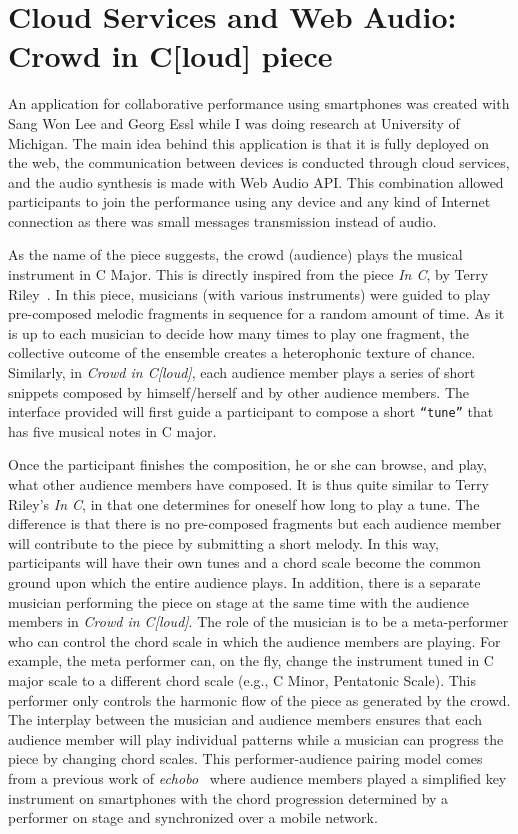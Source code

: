 \section{Cloud Services and Web Audio: Crowd in C[loud] piece}
\label{apesec:appcrowdincloud}

An application for collaborative performance using smartphones was created with Sang Won Lee and Georg Essl while I was doing research at University of Michigan.
The main idea behind this application is that it is fully deployed on the web, the communication between devices is conducted through cloud services, and the audio synthesis is made with Web Audio API.
This combination allowed participants to join the performance using any device and any kind of Internet connection as there was small messages transmission instead of audio.

As the name of the piece suggests, the crowd (audience) plays the musical instrument in C Major. 
This is directly inspired from the piece \textit{In C}, by Terry Riley~\citep{Riley1964inc}. 
In this piece, musicians (with various instruments) were guided to play pre-composed melodic fragments in sequence for a random amount of time. 
As it is up to each musician to decide how many times to play one fragment, the collective outcome of the ensemble creates a heterophonic texture of chance.
Similarly, in \textit{Crowd in C[loud]}, each audience member plays a series of short snippets composed by himself/herself and by other audience members.
The interface provided will first guide a participant to compose a short \texttt{``tune''} that has five musical notes in C major.

Once the participant finishes the composition, he or she can browse, and play, what other audience members have composed. 
It is thus quite similar to Terry Riley's \textit{In C}, in that one determines for oneself how long to play a tune. 
The difference is that there is no pre-composed fragments but each audience member will contribute to the piece by submitting a short melody.
In this way, participants will have their own tunes and a chord scale become the common ground upon which the entire audience plays. 
In addition, there is a separate musician performing the piece on stage at the same time with the audience members in \textit{Crowd in C[loud]}.
The role of the musician is to be a meta-performer who can control the chord scale in which the audience members are playing.
For example, the meta performer can, on the fly, change the instrument tuned in C major scale to a different chord scale (e.g., C Minor, Pentatonic Scale). 
This performer only controls the harmonic flow of the piece as generated by the crowd.
The interplay between the musician and audience members ensures that each audience member will play individual patterns while a musician can progress the piece by changing chord scales. 
This performer-audience pairing model comes from a previous work of \textit{echobo}~\citep{Lee2013echobo} where audience members played a simplified key instrument on smartphones with the chord progression determined by a performer on stage and synchronized over a mobile network.

